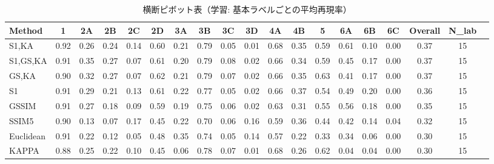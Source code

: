 \documentclass{jarticle}
\theoremstyle{definition}
\begin{document}
\begin{table*}[t!]
\centering
\caption{横断ピボット表（学習: 基本ラベルごとの平均再現率）}
\label{tab:pivot_train}
\scriptsize
\setlength{\tabcolsep}{3pt}
\begin{tabular}{lcccccccccccccccccc}
\hline
Method & 1 & 2A & 2B & 2C & 2D & 3A & 3B & 3C & 3D & 4A & 4B & 5 & 6A & 6B & 6C & Overall & N\_lab \\
\hline
S1,KA      & 0.92 & 0.26 & 0.24 & 0.14 & 0.60 & 0.21 & 0.79 & 0.05 & 0.01 & 0.68 & 0.35 & 0.59 & 0.61 & 0.10 & 0.00 & 0.37 & 15 \\
S1,GS,KA   & 0.91 & 0.35 & 0.27 & 0.07 & 0.61 & 0.20 & 0.79 & 0.08 & 0.02 & 0.66 & 0.34 & 0.59 & 0.45 & 0.17 & 0.00 & 0.37 & 15 \\
GS,KA      & 0.90 & 0.32 & 0.27 & 0.07 & 0.62 & 0.21 & 0.79 & 0.07 & 0.02 & 0.66 & 0.35 & 0.63 & 0.41 & 0.17 & 0.00 & 0.37 & 15 \\
S1         & 0.91 & 0.29 & 0.21 & 0.13 & 0.61 & 0.22 & 0.77 & 0.05 & 0.02 & 0.66 & 0.37 & 0.54 & 0.49 & 0.20 & 0.00 & 0.36 & 15 \\
GSSIM      & 0.91 & 0.27 & 0.18 & 0.09 & 0.59 & 0.19 & 0.75 & 0.06 & 0.02 & 0.63 & 0.31 & 0.55 & 0.56 & 0.18 & 0.00 & 0.35 & 15 \\
SSIM5      & 0.90 & 0.13 & 0.07 & 0.17 & 0.45 & 0.22 & 0.70 & 0.06 & 0.16 & 0.59 & 0.36 & 0.44 & 0.42 & 0.14 & 0.04 & 0.32 & 15 \\
Euclidean  & 0.91 & 0.22 & 0.12 & 0.05 & 0.48 & 0.35 & 0.74 & 0.05 & 0.14 & 0.57 & 0.22 & 0.33 & 0.34 & 0.06 & 0.00 & 0.30 & 15 \\
KAPPA      & 0.88 & 0.25 & 0.22 & 0.10 & 0.45 & 0.06 & 0.78 & 0.07 & 0.01 & 0.68 & 0.26 & 0.62 & 0.04 & 0.04 & 0.00 & 0.30 & 15 \\
\hline
\end{tabular}
\end{table*}
\end{document}
